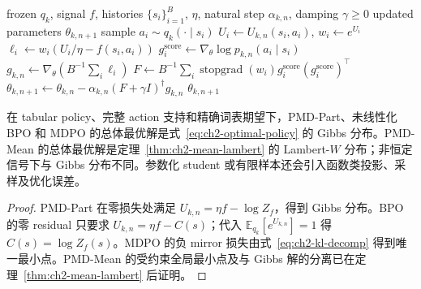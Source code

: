 \begin{algorithm}[ht]
\caption{MDPO natural-gradient inner update\\{\small\textit{Semantics: 最小化固定 history 的负 mirror objective}}}
\begin{algorithmic}[1]
\Require frozen $ q_k$, signal $f$, histories $\{s_i\}_{i=1}^{B}$, $\eta$, natural step $\alpha_{k,n}$, damping $\gamma\ge0$
\Ensure updated parameters $\theta_{k,n+1}$
    \State sample $a_i\sim q_k(\cdot\mid s_i)$
    \State $U_i\gets U_{k,n}(s_i,a_i)$, $w_i\gets e^{U_i}$
    \State $\ell_i\gets w_i(U_i/\eta-f(s_i,a_i))$ 
    \State $g_i^{\mathrm{score}}\gets\nabla_\theta\log p_{k,n}(a_i\mid s_i)$
\EndFor
\State $g_{k,n}\gets\nabla_\theta(B^{-1}\sum_i\ell_i)$
\State $F\gets B^{-1}\sum_i\operatorname{stopgrad}(w_i)g_i^{\mathrm{score}}(g_i^{\mathrm{score}})^\top$
\State $\theta_{k,n+1}\gets\theta_{k,n}-\alpha_{k,n}(F+\gamma I)^\dagger g_{k,n}$
\State \Return $\theta_{k,n+1}$
\end{algorithmic}
\end{algorithm}

\begin{theorem}
\label{thm:ch2-inner-common-root}
在 tabular policy、完整 action 支持和精确词表期望下，PMD-Part、未线性化 BPO 和 MDPO 的总体最优解是式~\eqref{eq:ch2-optimal-policy} 的 Gibbs 分布。PMD-Mean 的总体最优解是定理~\ref{thm:ch2-mean-lambert} 的 Lambert-$W$ 分布；非恒定信号下与 Gibbs 分布不同。参数化 student 或有限样本还会引入函数类投影、采样及优化误差。
\end{theorem}

\begin{proof}
PMD-Part 在零损失处满足 $U_{k,n}=\eta f-\log Z_f$，得到 Gibbs 分布。BPO 的零 residual 只要求 $U_{k,n}=\eta f-C(s)$；代入 $\mathbb E_{ q_k}[e^{U_{k,n}}]=1$ 得 $C(s)=\log Z_f(s)$。MDPO 的负 mirror 损失由式~\eqref{eq:ch2-kl-decomp} 得到唯一最小点。PMD-Mean 的受约束全局最小点及与 Gibbs 解的分离已在定理~\ref{thm:ch2-mean-lambert} 后证明。
\end{proof}

